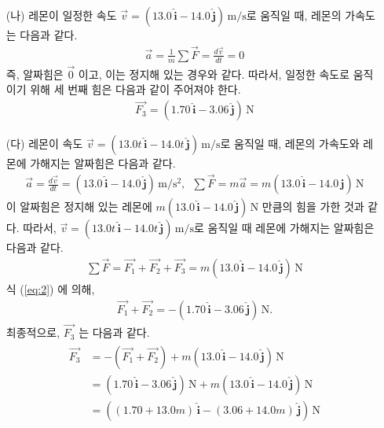 \documentclass[floatfix,nofootinbib,superscriptaddress,fleqn,preprint]{revtex4}
\begin{document}
\begin{itemize}
  \item[(나)] 레몬이 일정한 속도 $\vec{v} =(13.0\,\hat{\bm{i}} -
  14.0\,\hat{\bm{j}})\,\mathrm{m/s}$로 움직일 때, 레몬의
  가속도는 다음과 같다.
  \begin{align}
    \vec{a} = \frac{1}{m}\sum\vec{F}=\frac{d\vec{v}}{dt} = 0
  \end{align}
  즉, 알짜힘은 $\vec{0}$ 이고, 이는 정지해 있는 경우와 같다.
  따라서, 일정한 속도로 움직이기 위해 세 번째 힘은 
  다음과 같이 주어져야 한다.
  \begin{align}
    \vec{F_3}=(1.70\,\hat{\bm{i}} -
    3.06\,\hat{\bm{j}})\,\mathrm{N}
  \end{align}
  \item[(다)] 레몬이 속도 $\vec{v} =(13.0t\,\hat{\bm{i}} -
  14.0t\,\hat{\bm{j}})\,\mathrm{m/s}$로 움직일 때, 레몬의
  가속도와 레몬에 가해지는 알짜힘은 다음과 같다.
  \begin{align}
    \vec{a} = \frac{d\vec{v}}{dt} = (13.0\,\hat{\bm{i}} -
    14.0\,\hat{\bm{j}})\,\mathrm{m/s^2},\,\,\,
    \sum\vec{F}=m\vec{a} =m(13.0\,\hat{\bm{i}} -
    14.0\,\hat{\bm{j}})\,\mathrm{N}
  \end{align}
  이 알짜힘은 정지해 있는 레몬에 $m(13.0\,\hat{\bm{i}} -
  14.0\,\hat{\bm{j}})\,\mathrm{N}$ 만큼의 힘을 가한 것과 같다. 
  따라서, $\vec{v} =(13.0t\,\hat{\bm{i}} -
  14.0t\,\hat{\bm{j}})\,\mathrm{m/s}$로 움직일 때 레몬에 가해지는 알짜힘은
  다음과 같다.
  \begin{align}
    \sum\vec{F} = \vec{F_1}+\vec{F_2}+\vec{F_3} 
    = m(13.0\,\hat{\bm{i}} - 14.0\,\hat{\bm{j}})\,\mathrm{N}
  \end{align}
  식 (\ref{eq:2}) 에 의해,
  \begin{align}
    \vec{F_1}+\vec{F_2} = -(1.70\,\hat{\bm{i}} -
    3.06\,\hat{\bm{j}})\,\mathrm{N}.
  \end{align}
  최종적으로, $\vec{F_3}$ 는 다음과 같다.
  \begin{align}
    \begin{split}
      \vec{F_3} &= -(\vec{F_1}+\vec{F_2})
      +m(13.0\,\hat{\bm{i}} -14.0\,\hat{\bm{j}})\,\mathrm{N}  \\
      &= (1.70\,\hat{\bm{i}} -
      3.06\,\hat{\bm{j}})\,\mathrm{N}
      +m(13.0\,\hat{\bm{i}} -14.0\,\hat{\bm{j}})\,\mathrm{N}  \\
      &=((1.70+13.0m)\,\hat{\bm{i}}-(3.06+14.0m)\,\hat{\bm{j}})\,\mathrm{N}
    \end{split}
  \end{align}
\end{itemize}
\vspace{2cm}
\end{document}
